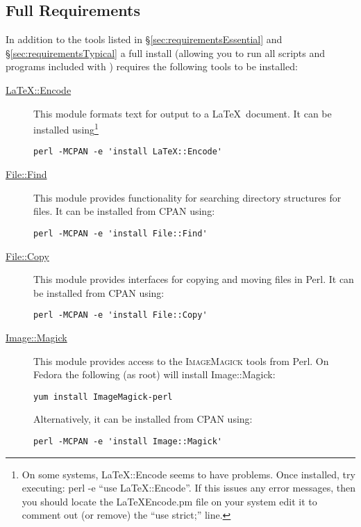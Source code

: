 \subsection{Full Requirements}\label{sec:requirementsFull}

In addition to the tools listed in \S\ref{sec:requirementsEssential} and \S\ref{sec:requirementsTypical} a full install (allowing you to run all scripts and programs included with \glc) requires the following tools to be installed:

\begin{description}
\item [\href{http://search.cpan.org/~andrewf/LaTeX-Encode-0.03/lib/LaTeX/Encode.pm}{{\normalfont \ttfamily LaTeX::Encode }}] This module formats text for output to a \LaTeX\ document. It can be installed using\footnote{On some systems, {\normalfont \ttfamily LaTeX::Encode} seems to have problems. Once installed, try executing: {\normalfont \ttfamily perl -e ``use LaTeX::Encode''}. If this issues any error messages, then you should locate the {\normalfont \ttfamily LaTeX\/Encode.pm} file on your system edit it to comment out (or remove) the ``{\normalfont \ttfamily use strict;}'' line.}
\begin{verbatim}
perl -MCPAN -e 'install LaTeX::Encode'
\end{verbatim}
  \item [\href{http://search.cpan.org/~jesse/perl-5.12.1/lib/File/Find.pm}{{\normalfont \ttfamily File::Find}}] This module provides functionality for searching directory structures for files. It can be installed from CPAN using:
\begin{verbatim}
perl -MCPAN -e 'install File::Find'
\end{verbatim}
  \item [\href{http://search.cpan.org/~jesse/perl-5.12.1/lib/File/Copy.pm}{{\normalfont \ttfamily File::Copy}}] This module provides interfaces for copying and moving files in Perl. It can be installed from CPAN using:
\begin{verbatim}
perl -MCPAN -e 'install File::Copy'
\end{verbatim}
  \item [\href{http://search.cpan.org/~jcristy/PerlMagick-6.59/Magick.pm}{{\normalfont \ttfamily Image::Magick}}] This module provides access to the {\normalfont \scshape ImageMagick} tools from Perl. On Fedora the following (as root) will install {\normalfont \ttfamily Image::Magick}:
\begin{verbatim}
yum install ImageMagick-perl
\end{verbatim}
Alternatively, it can be installed from CPAN using:
\begin{verbatim}
perl -MCPAN -e 'install Image::Magick'
\end{verbatim}


\end{description}
